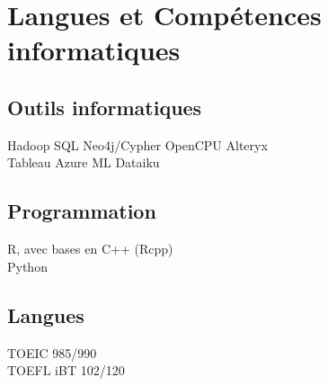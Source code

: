 \documentclass[a4paper]{deedy-resume} %
\begin{document}
\sectionspace %
\sectionspace %


\section{Langues et Compétences informatiques}

\begin{minipage}[t]{0.50\textwidth}

\subsection{Outils informatiques}

Hadoop \textbullet{} SQL \textbullet{} Neo4j/Cypher \textbullet{} OpenCPU \textbullet{} Alteryx\\
Tableau \textbullet{} Azure ML \textbullet{} Dataiku \\

\end{minipage}
\begin{minipage}[t]{0.29\textwidth}

\subsection{Programmation}

R, avec bases en C++ (Rcpp) \\
Python \\

\end{minipage}
\begin{minipage}[t]{0.20\textwidth}
\subsection{Langues}

TOEIC 985/990 \\
TOEFL iBT 102/120 \\

\end{minipage}

\sectionspace %
\sectionspace %
\end{document}
